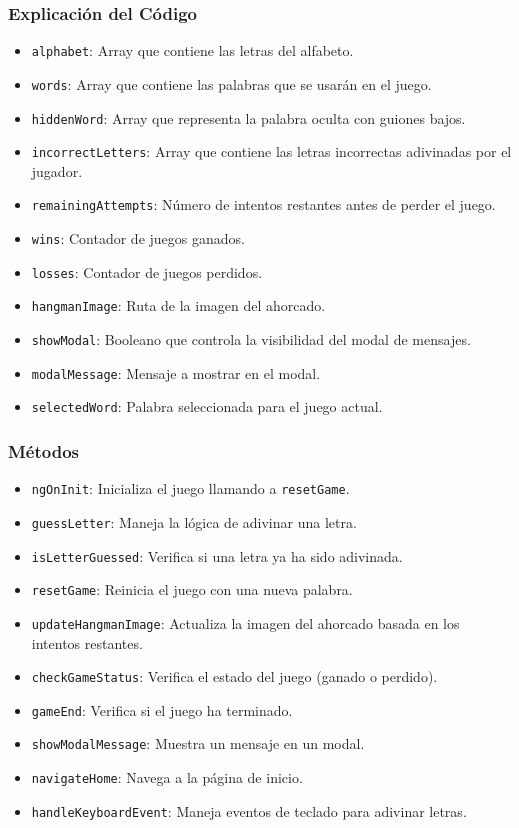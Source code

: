 \documentclass{article}
\begin{document}
\begin{itemize}
\subsubsection{Explicación del Código}

\begin{itemize}
  \item \texttt{alphabet}: Array que contiene las letras del alfabeto.
  \item \texttt{words}: Array que contiene las palabras que se usarán en el juego.
  \item \texttt{hiddenWord}: Array que representa la palabra oculta con guiones bajos.
  \item \texttt{incorrectLetters}: Array que contiene las letras incorrectas adivinadas por el jugador.
  \item \texttt{remainingAttempts}: Número de intentos restantes antes de perder el juego.
  \item \texttt{wins}: Contador de juegos ganados.
  \item \texttt{losses}: Contador de juegos perdidos.
  \item \texttt{hangmanImage}: Ruta de la imagen del ahorcado.
  \item \texttt{showModal}: Booleano que controla la visibilidad del modal de mensajes.
  \item \texttt{modalMessage}: Mensaje a mostrar en el modal.
  \item \texttt{selectedWord}: Palabra seleccionada para el juego actual.
\end{itemize}

\subsubsection{Métodos}

\begin{itemize}
  \item \texttt{ngOnInit}: Inicializa el juego llamando a \texttt{resetGame}.
  \item \texttt{guessLetter}: Maneja la lógica de adivinar una letra.
  \item \texttt{isLetterGuessed}: Verifica si una letra ya ha sido adivinada.
  \item \texttt{resetGame}: Reinicia el juego con una nueva palabra.
  \item \texttt{updateHangmanImage}: Actualiza la imagen del ahorcado basada en los intentos restantes.
  \item \texttt{checkGameStatus}: Verifica el estado del juego (ganado o perdido).
  \item \texttt{gameEnd}: Verifica si el juego ha terminado.
  \item \texttt{showModalMessage}: Muestra un mensaje en un modal.
  \item \texttt{navigateHome}: Navega a la página de inicio.
  \item \texttt{handleKeyboardEvent}: Maneja eventos de teclado para adivinar letras.
\end{itemize}


\end{itemize}
\end{document}
